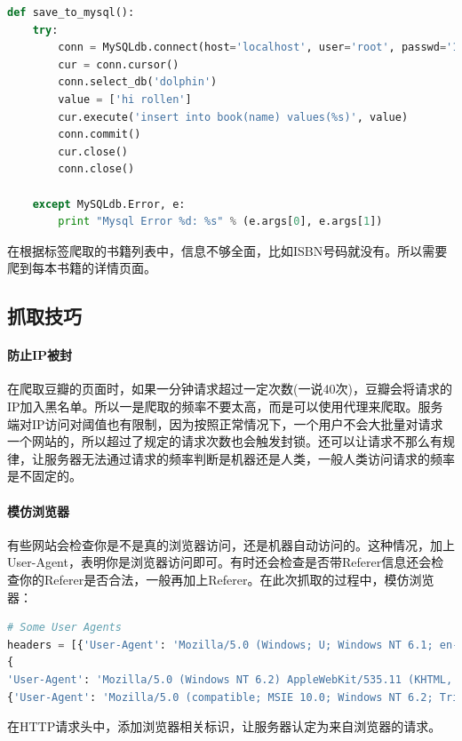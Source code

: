 \documentclass[letter]{book}
\begin{document}
\begin{lstlisting}[language=Python]
def save_to_mysql():
	try:
		conn = MySQLdb.connect(host='localhost', user='root', passwd='123456', port=3306)
		cur = conn.cursor()
		conn.select_db('dolphin')
		value = ['hi rollen']
		cur.execute('insert into book(name) values(%s)', value)
		conn.commit()
		cur.close()
		conn.close()
	
	except MySQLdb.Error, e:
		print "Mysql Error %d: %s" % (e.args[0], e.args[1])
\end{lstlisting}

在根据标签爬取的书籍列表中，信息不够全面，比如ISBN号码就没有。所以需要爬到每本书籍的详情页面。

\subsection{抓取技巧}

\paragraph{防止IP被封}在爬取豆瓣的页面时，如果一分钟请求超过一定次数(一说40次)，豆瓣会将请求的IP加入黑名单。所以一是爬取的频率不要太高，而是可以使用代理来爬取。服务端对IP访问对阈值也有限制，因为按照正常情况下，一个用户不会大批量对请求一个网站的，所以超过了规定的请求次数也会触发封锁。还可以让请求不那么有规律，让服务器无法通过请求的频率判断是机器还是人类，一般人类访问请求的频率是不固定的。

\paragraph{模仿浏览器}有些网站会检查你是不是真的浏览器访问，还是机器自动访问的。这种情况，加上User-Agent，表明你是浏览器访问即可。有时还会检查是否带Referer信息还会检查你的Referer是否合法，一般再加上Referer。在此次抓取的过程中，模仿浏览器：

\begin{lstlisting}[language=Python]
# Some User Agents
headers = [{'User-Agent': 'Mozilla/5.0 (Windows; U; Windows NT 6.1; en-US; rv:1.9.1.6) Gecko/20091201 Firefox/3.5.6'}, \
{
'User-Agent': 'Mozilla/5.0 (Windows NT 6.2) AppleWebKit/535.11 (KHTML, like Gecko) Chrome/17.0.963.12 Safari/535.11'}, \
{'User-Agent': 'Mozilla/5.0 (compatible; MSIE 10.0; Windows NT 6.2; Trident/6.0)'}]
\end{lstlisting}

在HTTP请求头中，添加浏览器相关标识，让服务器认定为来自浏览器的请求。
\end{document}
